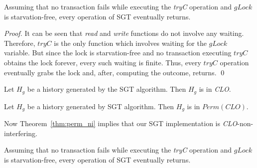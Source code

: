 \documentclass{llncs}
\newcommand{\cmnt}[1]{}
\newcommand{\thmref}[1]{Theorem~\ref{thm:#1}}
\newcommand{\op} {operation}
\newcommand{\clo} {\textit{CLO}}
\newcommand{\permfn}[1] {\textit{Perm}(#1)}
\newcommand{\gchist} {\textit{gComHist}}
\newcommand{\gchlock} {\textit{gLock}}
\newcommand{\tryc} {\textit{tryC}}
\newcommand{\sgt} {SGT}
\begin{document}
\begin{theorem}
\label{thm:live}
Assuming that no transaction fails while executing the \tryc{} \op{}
and $\gchlock$ is starvation-free, every operation of \sgt{} eventually returns. 
\end{theorem}

\begin{proof}
It can be seen that \textit{read} and \textit{write} functions do not involve
any waiting. 
Therefore, $\tryc$ is the only function which involves waiting for 
the $\gchlock$ variable. But since the lock is starvation-free
and no transaction executing $\tryc$ obtains the lock forever, 
every such waiting is finite. 
Thus, every $\tryc$ \op{} eventually grabs the lock and, after,
computing the outcome, returns. \qed
\end{proof}




\begin{theorem}
\label{thm:main-gen-clo}
Let $H_g$ be a history generated by the \sgt{} algorithm. Then $H_g$ is in \clo.
\end{theorem}

\begin{theorem}
\label{thm:main-perm}
Let $H_g$ be a history generated by \sgt{} algorithm. Then $H_g$ is in $\permfn{\clo}$. 
\end{theorem}
Now \thmref{perm_ni} implies that our \sgt{} implementation is \clo-non-interfering.

\begin{theorem}
\label{thm:main-live}
Assuming that no transaction fails while executing the \tryc{} \op{} and $\gchlock$ is starvation-free, every operation of \sgt{} eventually returns. 
\end{theorem}

\cmnt {
\vspace{1mm}
\noindent
\textit{Garbage Collection.} Over time, the history of committed transactions maintained by our \sgt{} algorithm in the global variable  $\gchist$ grows without bound. To check the size of \gchist, we have developed a simple garbage-collection scheme that allows to keep the size of $\gchist$ proportional to the current contention, i.e, to the number of concurrently live transactions. The procedure has been described in \cite{KP12:TR}. The idea is to periodically remove from $\gchist$ the sub-histories corresponding to committed transactions that become \emph{obsolete}, i.e., the effect of them can be reduced to the updates of t-objects.
}
\end{document}
